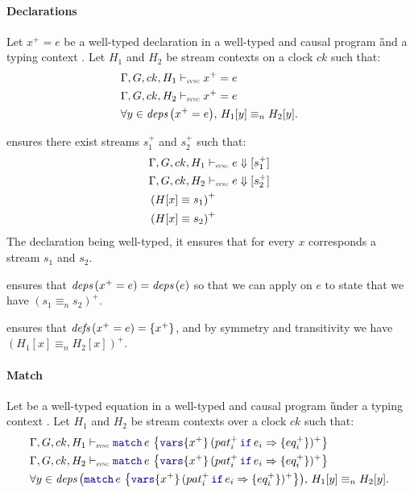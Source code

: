 \begin{skippableproof}
    \paragraph{Declarations}
    Let $x^+ = e$ be a well-typed declaration in a well-typed and causal program \G and a typing
    context \tyCtx. Let $H_1$ and $H_2$ be stream contexts on a clock $ck$ such that:
    \begin{align*}
         & \eqDenot{H_1}{ck}{x^+ = e}                               \\
         & \eqDenot{H_2}{ck}{x^+ = e}                               \\
         & \forall y \in \deps{x^+ = e}, \, H_1[y] \equiv_n H_2[y].
    \end{align*}

     ensures there exist streams $s_1^+$ and $s_2^+$
    such that:
    \begin{align*}
         & \exprDenot{H_1}{ck}{e}{s_1^+}  \\
         & \exprDenot{H_2}{ck}{e}{s_2^+}  \\
         & \left(H[x] \equiv s_1\right)^+ \\
         & \left(H[x] \equiv s_2\right)^+
    \end{align*}
    The declaration being well-typed, it ensures that for every $x$ corresponds a stream $s_1$ and
    $s_2$.

     ensures that $\deps{x^+ = e} =
        \deps{e}$ so that we can apply  on $e$ to state that
    we have $(s_1 \equiv_n s_2)^+$.

     ensures that $\defs{x^+ = e} = \{x^+\}$, and
    by symmetry and transitivity we have $(H_1[x] \equiv_n H_2[x])^+$.

    \paragraph{Match}
    Let  be a well-typed  equation in a
    well-typed and causal program \G under a typing context \tyCtx. Let $H_1$ and $H_2$ be stream
    contexts over a clock $ck$ such that:
    \begin{align*}
         & \eqDenot{H_1}{ck}{\match{e}{x^+}{(\branch{pat_i^+}{e_i}{eq_i^+})^+}}                               \\
         & \eqDenot{H_2}{ck}{\match{e}{x^+}{(\branch{pat_i^+}{e_i}{eq_i^+})^+}}                               \\
         & \forall y \in \deps{\match{e}{x^+}{(\branch{pat_i^+}{e_i}{eq_i^+})^+}}, \, H_1[y] \equiv_n H_2[y].
    \end{align*}


\end{skippableproof}
